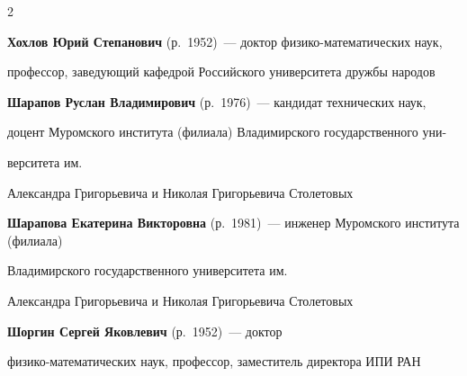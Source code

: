 \begin{multicols}{2}
\vspace*{3pt}



\noindent

\textbf{Хохлов Юрий Степанович} (р.\ 1952)~--- доктор фи\-зи\-ко-ма\-те\-ма\-ти\-че\-ских наук, 

профессор, заведующий кафедрой Российского университета дружбы народов



\vspace*{3pt}



\noindent

\textbf{Шарапов Руслан Владимирович} (р.\ 1976)~--- кандидат технических наук, 

доцент Муромского института (филиала) Владимирского государственного уни-\linebreak\vspace*{-12pt}



\columnbreak



\noindent

верситета им.\

Александра Григорьевича и Николая Григорьевича Столетовых






\vspace*{5pt}



\noindent

\textbf{Шарапова Екатерина Викторовна} (р.\ 1981)~--- инженер Муромского института (филиала) 

Владимирского государственного университета им.\ 

Александра Григорьевича и Николая Григорьевича \mbox{Столетовых}



\vspace*{5pt}



\noindent

\textbf{Шоргин Сергей Яковлевич} (р.\ 1952)~--- доктор 

фи\-зи\-ко-математических наук, профессор, заместитель директора ИПИ РАН 



\vspace*{5pt}




\end{multicols}
